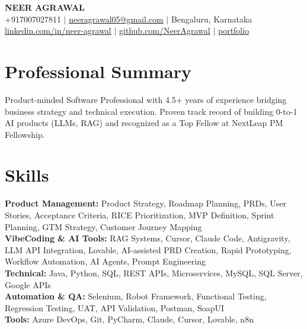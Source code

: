 \documentclass[10pt,a4paper]{article}
\begin{document}
\sloppy

\begin{center}
    {\Huge \textbf{NEER AGRAWAL}} \\[2pt]
    +917007027811 $|$
    \href{mailto:neeragrawal05@gmail.com}{neeragrawal05@gmail.com} $|$
    Bengaluru, Karnataka \\[1pt]
    \href{https://www.linkedin.com/in/neer-agrawal-7141b3201/}{linkedin.com/in/neer-agrawal}
    $|$
    \href{https://github.com/NeerAgrawal}{github.com/NeerAgrawal}
    $|$
    \href{https://nextleap.app/portfolio/neer-agrawal}{portfolio}
\end{center}

\vspace{-6pt}

\section{Professional Summary}
Product-minded Software Professional with 4.5+ years of experience bridging business strategy and technical execution. Proven track record of building 0-to-1 AI products (LLMs, RAG) and recognized as a Top Fellow at NextLeap PM Fellowship.
\vspace{1pt}

\section{Skills}
\textbf{Product Management:} Product Strategy, Roadmap Planning, PRDs, User Stories, Acceptance Criteria, RICE Prioritization, MVP Definition, Sprint Planning, GTM Strategy, Customer Journey Mapping \\
\textbf{VibeCoding \& AI Tools:} RAG Systems, Cursor, Claude Code, Antigravity, LLM API Integration, Lovable, AI-assisted PRD Creation, Rapid Prototyping, Workflow Automation, AI Agents, Prompt Engineering \\
\textbf{Technical:} Java, Python, SQL, REST APIs, Microservices, MySQL, SQL Server, Google APIs \\
\textbf{Automation \& QA:} Selenium, Robot Framework, Functional Testing, Regression Testing, UAT, API Validation, Postman, SoapUI \\
\textbf{Tools:} Azure DevOps, Git, PyCharm, Claude, Cursor, Lovable, n8n
\vspace{1pt}
\end{document}
